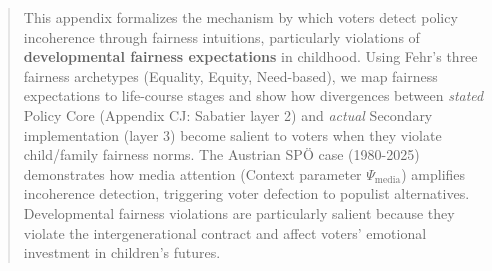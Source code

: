 

\begin{abstract}

This appendix formalizes the mechanism by which voters detect policy incoherence through
fairness intuitions, particularly violations of \textbf{developmental fairness expectations}
in childhood. Using Fehr's three fairness archetypes (Equality, Equity, Need-based),
we map fairness expectations to life-course stages and show how divergences between
\textit{stated} Policy Core (Appendix CJ: Sabatier layer 2) and \textit{actual} Secondary
implementation (layer 3) become salient to voters when they violate child/family fairness
norms. The Austrian SPÖ case (1980-2025) demonstrates how media attention (Context parameter $\Psi_{\text{media}}$)
amplifies incoherence detection, triggering voter defection to populist alternatives.
Developmental fairness violations are particularly salient because they violate the
intergenerational contract and affect voters' emotional investment in children's futures.

\end{abstract}


